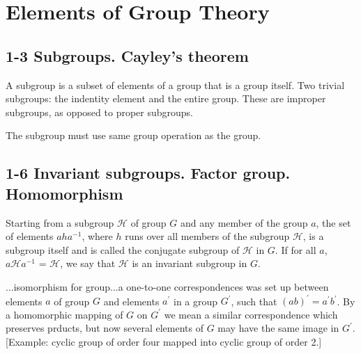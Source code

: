 \documentclass{book}
\begin{document}
\chapter{Elements of Group Theory}

\section{}
\section{}

\section{1-3 Subgroups. Cayley's theorem}

A subgroup is a subset of elements of a group that is a group itself. Two trivial subgroups: the indentity element and the entire group. These are improper subgroups, as opposed to proper subgroups.

The subgroup must use same group operation as the group.

\section{}
\section{}

\section{1-6 Invariant subgroups. Factor group. Homomorphism}

Starting from a subgroup $\mathcal H$ of group $G$ and any member of the group $a$, the set of elements $aha^{-1}$, where $h$ runs over all members of the subgroup $\mathcal H$, is a subgroup itself and is called the conjugate subgroup of $\mathcal H$ in $G$. If for all $a$, $a{\mathcal H} a^{-1}$ =  $\mathcal H$, we say that $\mathcal H$ is an invariant subgroup in $G$.

...isomorphism for group...a one-to-one correspondences was set up between elements $a$ of group $G$ and elements $a^\prime$ in a group $G^\prime$, such that $(ab)^\prime = a^\prime b^\prime$. By a homomorphic mapping of $G$ on $G^\prime$ we mean a similar correspondence which preserves prducts, but now several elements of $G$ may have the same image in $G^\prime$. [Example: cyclic group of order four mapped into cyclic group of order 2.]
\end{document}
